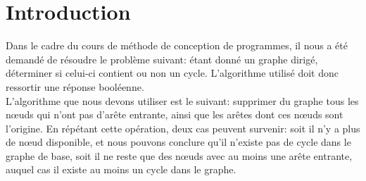 
\section*{Introduction}
Dans le cadre du cours de méthode de conception de programmes, il nous a été demandé de résoudre le problème suivant: étant donné un graphe dirigé, déterminer si celui-ci contient ou non un cycle. L'algorithme utilisé doit donc ressortir une réponse booléenne.\\

L'algorithme que nous devons utiliser est le suivant: supprimer du graphe tous les nœuds qui n'ont pas d'arête entrante, ainsi que les arêtes dont ces nœuds sont l'origine. En répétant cette opération, deux cas peuvent survenir: soit il n'y a plus de nœud disponible, et nous pouvons conclure qu'il n'existe pas de cycle dans le graphe de base, soit il ne reste que des nœuds avec au moins une arête entrante, auquel cas il existe au moins un cycle dans le graphe.


